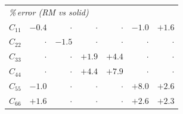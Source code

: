 \begin{table}[t]
\begin{tabular}{lrrrrrr}
\midrule
\multicolumn{7}{l}{\textit{\%\,error (RM vs solid)}}\\
$C_{11}$ & $-0.4$ & $\cdot$ & $\cdot$ & $\cdot$ & $-1.0$ & $+1.6$\\
$C_{22}$ & $\cdot$ & $-1.5$ & $\cdot$ & $\cdot$ & $\cdot$ & $\cdot$\\
$C_{33}$ & $\cdot$ & $\cdot$ & $+1.9$ & $+4.4$ & $\cdot$ & $\cdot$\\
$C_{44}$ & $\cdot$ & $\cdot$ & $+4.4$ & $+7.9$ & $\cdot$ & $\cdot$\\
$C_{55}$ & $-1.0$ & $\cdot$ & $\cdot$ & $\cdot$ & $+8.0$ & $+2.6$\\
$C_{66}$ & $+1.6$ & $\cdot$ & $\cdot$ & $\cdot$ & $+2.6$ & $+2.3$\\
\bottomrule
\end{tabular}
\end{table}